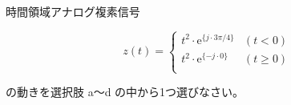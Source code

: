 時間領域アナログ複素信号 

\[
z(t) = 
\begin{cases}
t^2 \cdot \textrm{e}^{\{j \cdot 3 \pi/4 \}} & (t < 0)  \\
t^2 \cdot \textrm{e}^{\{-j\cdot 0 \}} & (t \geq 0)  \\
\end{cases}
\]

\medskip
\noindent の動きを選択肢 a〜d の中から1つ選びなさい。
